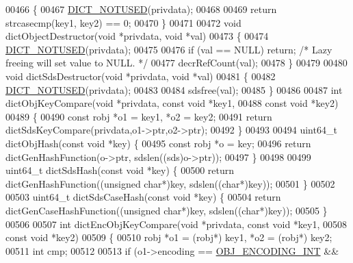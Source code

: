 \begin{DoxyCode}
{{{{{00466 \{
00467     \hyperlink{dict_8h_aa077e877a37a7dc65056290a2c9760da}{DICT\_NOTUSED}(privdata);
00468 
00469     \textcolor{keywordflow}{return} strcasecmp(key1, key2) == 0;
00470 \}
00471 
00472 \textcolor{keywordtype}{void} dictObjectDestructor(\textcolor{keywordtype}{void} *privdata, \textcolor{keywordtype}{void} *val)
00473 \{
00474     \hyperlink{dict_8h_aa077e877a37a7dc65056290a2c9760da}{DICT\_NOTUSED}(privdata);
00475 
00476     \textcolor{keywordflow}{if} (val == NULL) \textcolor{keywordflow}{return}; \textcolor{comment}{/* Lazy freeing will set value to NULL. */}
00477     decrRefCount(val);
00478 \}
00479 
00480 \textcolor{keywordtype}{void} dictSdsDestructor(\textcolor{keywordtype}{void} *privdata, \textcolor{keywordtype}{void} *val)
00481 \{
00482     \hyperlink{dict_8h_aa077e877a37a7dc65056290a2c9760da}{DICT\_NOTUSED}(privdata);
00483 
00484     sdsfree(val);
00485 \}
00486 
00487 \textcolor{keywordtype}{int} dictObjKeyCompare(\textcolor{keywordtype}{void} *privdata, \textcolor{keyword}{const} \textcolor{keywordtype}{void} *key1,
00488         \textcolor{keyword}{const} \textcolor{keywordtype}{void} *key2)
00489 \{
00490     \textcolor{keyword}{const} robj *o1 = key1, *o2 = key2;
00491     \textcolor{keywordflow}{return} dictSdsKeyCompare(privdata,o1->ptr,o2->ptr);
00492 \}
00493 
00494 uint64\_t dictObjHash(\textcolor{keyword}{const} \textcolor{keywordtype}{void} *key) \{
00495     \textcolor{keyword}{const} robj *o = key;
00496     \textcolor{keywordflow}{return} dictGenHashFunction(o->ptr, sdslen((sds)o->ptr));
00497 \}
00498 
00499 uint64\_t dictSdsHash(\textcolor{keyword}{const} \textcolor{keywordtype}{void} *key) \{
00500     \textcolor{keywordflow}{return} dictGenHashFunction((\textcolor{keywordtype}{unsigned} \textcolor{keywordtype}{char}*)key, sdslen((\textcolor{keywordtype}{char}*)key));
00501 \}
00502 
00503 uint64\_t dictSdsCaseHash(\textcolor{keyword}{const} \textcolor{keywordtype}{void} *key) \{
00504     \textcolor{keywordflow}{return} dictGenCaseHashFunction((\textcolor{keywordtype}{unsigned} \textcolor{keywordtype}{char}*)key, sdslen((\textcolor{keywordtype}{char}*)key));
00505 \}
00506 
00507 \textcolor{keywordtype}{int} dictEncObjKeyCompare(\textcolor{keywordtype}{void} *privdata, \textcolor{keyword}{const} \textcolor{keywordtype}{void} *key1,
00508         \textcolor{keyword}{const} \textcolor{keywordtype}{void} *key2)
00509 \{
00510     robj *o1 = (robj*) key1, *o2 = (robj*) key2;
00511     \textcolor{keywordtype}{int} cmp;
00512 
00513     \textcolor{keywordflow}{if} (o1->encoding == \hyperlink{server_8h_ae934cf008a0be0ef009c92c2d006a816}{OBJ\_ENCODING\_INT} &&
}}}}}
\end{DoxyCode}
